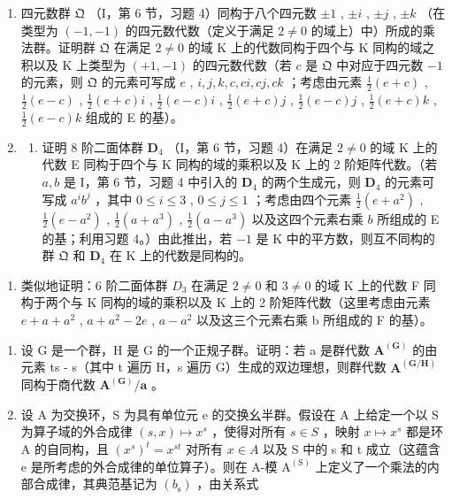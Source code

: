 \begin{enumerate}
\def\labelenumi{\arabic{enumi}.}
\setcounter{enumi}{7}
\item
  四元数群 \(\mathfrak{Q}\) （I，第 6 节，习题 4）同构于八个四元数 \(\pm 1\) , \(\pm i\) , \(\pm j\) , \(\pm k\) （在类型为 \((-1, -1)\) 的四元数代数（定义于满足 \(2 \neq 0\) 的域上）中）所成的乘法群。证明群 \(\mathfrak{Q}\) 在满足 \(2 \neq 0\) 的域 K 上的代数同构于四个与 K 同构的域之积以及 K 上类型为 \((+1, -1)\) 的四元数代数（若 \(c\) 是 \(\mathfrak{Q}\) 中对应于四元数 \(-1\) 的元素，则 \(\mathfrak{Q}\) 的元素可写成 \(e\) , \(i, j, k, c, ci, cj, ck\) ；考虑由元素 \(\frac{1}{2}(e + c)\) , \(\frac{1}{2}(e - c)\) , \(\frac{1}{2}(e + c)i\) , \(\frac{1}{2}(e - c)i\) , \(\frac{1}{2}(e + c)j\) , \(\frac{1}{2}(e - c)j\) , \(\frac{1}{2}(e + c)k\) , \(\frac{1}{2}(e - c)k\) 组成的 E 的基）。
\item
  \begin{enumerate}
  \def\labelenumii{(\alph{enumii})}
  \tightlist
  \item
    证明 8 阶二面体群 \(\mathbf{D}_4\) （I，第 6 节，习题 4）在满足 \(2 \neq 0\) 的域 K 上的代数 E 同构于四个与 K 同构的域的乘积以及 K 上的 2 阶矩阵代数。（若 \(a, b\) 是 I，第 6 节，习题 4 中引入的 \(\mathbf{D}_4\) 的两个生成元，则 \(\mathbf{D}_4\) 的元素可写成 \(a^i b^j\) ，其中 \(0 \leqslant i \leqslant 3\) , \(0 \leqslant j \leqslant 1\) ；考虑由四个元素 \(\frac{1}{2}(e + a^2)\) , \(\frac{1}{2}(e - a^2)\) , \(\frac{1}{2}(a + a^3)\) , \(\frac{1}{2}(a - a^3)\) 以及这四个元素右乘 \(b\) 所组成的 E 的基；利用习题 4。）由此推出，若 \(-1\) 是 K 中的平方数，则互不同构的群 \(\mathfrak{Q}\) 和 \(\mathbf{D}_4\) 在 K 上的代数是同构的。
  \end{enumerate}
\end{enumerate}

\begin{enumerate}
\def\labelenumi{(\alph{enumi})}
\setcounter{enumi}{1}
\tightlist
\item
  类似地证明：6 阶二面体群 \(D_{3}\) 在满足 \(2 \neq 0\) 和 \(3 \neq 0\) 的域 K 上的代数 F 同构于两个与 K 同构的域的乘积以及 K 上的 2 阶矩阵代数（这里考虑由元素 \(e + a + a^{2}\) , \(a + a^{2} - 2e\) , \(a - a^{2}\) 以及这三个元素右乘 b 所组成的 F 的基）。
\end{enumerate}

\begin{enumerate}
\def\labelenumi{\arabic{enumi}.}
\setcounter{enumi}{9}
\item
  设 G 是一个群，H 是 G 的一个正规子群。证明：若 a 是群代数 \(\mathbf{A}^{(\mathbf{G})}\) 的由元素 ts - s（其中 t 遍历 H，s 遍历 G）生成的双边理想，则群代数 \(\mathbf{A}^{(\mathbf{G}/\mathbf{H})}\) 同构于商代数 \(\mathbf{A}^{(\mathbf{G})}/\mathbf{a}\) 。
\item
  设 A 为交换环，S 为具有单位元 e 的交换幺半群。假设在 A 上给定一个以 S 为算子域的外合成律 \((s, x) \mapsto x^{s}\) ，使得对所有 \(s \in S\) ，映射 \(x \mapsto x^{s}\) 都是环 A 的自同构，且 \((x^{s})^{t} = x^{st}\) 对所有 \(x \in A\) 以及 S 中的 s 和 t 成立（这蕴含 e 是所考虑的外合成律的单位算子）。则在 A-模 \(\mathrm{A}^{(\mathrm{S})}\) 上定义了一个乘法的内部合成律，其典范基记为 \((b_{\mathrm{s}})\) ，由关系式
\end{enumerate}

